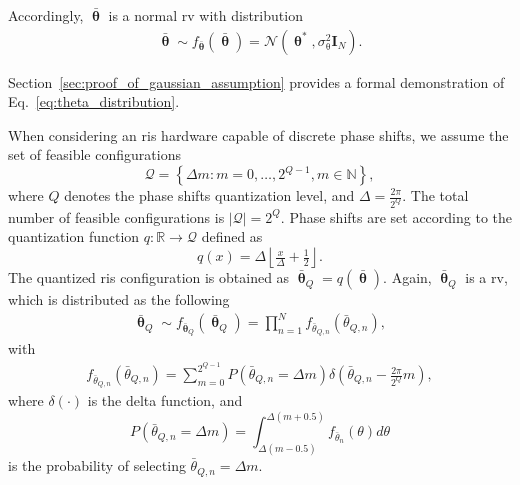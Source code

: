 \documentclass[10pt,journal,compsoc]{IEEEtran}
\newcommand{\ssub}[1]{{\scriptscriptstyle { #1}}}
\newcommand{\mb}[1]{\mathbf{{#1}}}
\begin{document}
Accordingly, $\bar{\boldsymbol{\uptheta}}$ is a normal \gls{rv} with distribution
\begin{align}
\bar{\boldsymbol{\uptheta}}\sim f_{\bar{\boldsymbol{\uptheta}}}(\bar{\boldsymbol{\uptheta}}) = \mathcal{N}(\boldsymbol{\uptheta}^*, \sigma^2_{\uptheta}\mb{I}_{\ssub{N}}). \label{eq:theta_distribution}
\end{align}

Section~\ref{sec:proof_of_gaussian_assumption} provides a formal demonstration of Eq.~\eqref{eq:theta_distribution}.

When considering an \gls{ris} hardware capable of discrete phase shifts, we assume the set of feasible configurations 
\begin{equation}
    \mathcal{Q} = \left\{\Delta m : m = 0,\dots, 2^{Q-1}, m \in \mathbb{N} \right\}, \label{eq:phase_quantization_set}
\end{equation}
 where $Q$ denotes the phase shifts quantization level, and $\Delta = \tfrac{2\pi}{2^Q}$. The total number of feasible configurations is $| \mathcal{Q} |=2^{Q}$. Phase shifts are set according to the quantization function $q: \mathbb{R} \rightarrow \mathcal{Q}$ defined as
\begin{equation}
q(x) = \Delta \left\lfloor \tfrac{x}{\Delta} + \tfrac{1}{2} \right\rfloor.
\end{equation}
The quantized \gls{ris} configuration is obtained as $\bar{\boldsymbol{\uptheta}}_{\ssub{Q}} = q(\bar{\boldsymbol{\uptheta}})$. Again, $\bar{\boldsymbol{\uptheta}}_{\ssub{Q}}$ is a \gls{rv}, which is distributed as the following 
\begin{align}
\bar{\boldsymbol{\uptheta}}_{\ssub{Q}}\sim f_{\bar{\boldsymbol{\uptheta}}_{\ssub{Q}}}(\bar{\boldsymbol{\uptheta}}_{\ssub{Q}}) =  \prod_{n=1}^{N} f_{\bar{\theta}_{\ssub{Q},n}}(\bar{\theta}_{\ssub{Q},n}), \label{eq:theta_distribution_quant}
\end{align}
with
\begin{align}
f_{\bar{\theta}_{\ssub{Q},n}}(\bar{\theta}_{\ssub{Q},n}) =  \sum_{m=0}^{2^{Q-1}} P\left(\bar{\theta}_{\ssub{Q},n}= \Delta m\right) 
\delta \left(\bar{\theta}_{\ssub{Q},n} - \tfrac{2\pi}{2^Q} m \right),\label{eq:theta_distribution_quant_el}
\end{align}
where $\delta(\cdot)$ is the delta function, and
\begin{equation}
P\left(\bar{\theta}_{\ssub{Q},n}= \Delta m\right) =  \int_{\Delta(m-0.5)}^{\Delta(m+0.5)} f_{\bar{\theta}_{n}}(\theta) d\theta
\end{equation}
is the probability of selecting $\bar{\theta}_{\ssub{Q},n}= \Delta m$.
\end{document}
